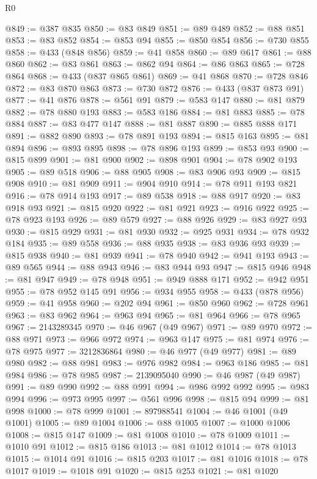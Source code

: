 \begin{lexlean}{R0}
\begin{coremodule}
@849 := @387 @835
@850 := @83 @849
@851 := @89 @489
@852 := @88 @851
@853 := @83 @852
@854 := @853 @94
@855 := @850 @854
@856 := @730 @855
@858 := @433 (@848 @856)
@859 := @41 @858
@860 := @89 @617
@861 := @88 @860
@862 := @83 @861
@863 := @862 @94
@864 := @86 @863
@865 := @728 @864
@868 := @433 (@837 @865 @861)
@869 := @41 @868
@870 := @728 @846
@872 := @83 @870 @863
@873 := @730 @872
@876 := @433 (@837 @873 @91)
@877 := @41 @876
@878 := @561 @91
@879 := @583 @147
@880 := @81 @879
@882 := @78 @880 @193
@883 := @583 @186
@884 := @81 @883
@885 := @78 @884
@887 := @83 @477 @147
@888 := @81 @887
@890 := @885 @888 @171
@891 := @882 @890
@893 := @78 @891 @193
@894 := @815 @163
@895 := @81 @894
@896 := @893 @895
@898 := @78 @896 @193
@899 := @853 @93
@900 := @815 @899
@901 := @81 @900
@902 := @898 @901
@904 := @78 @902 @193
@905 := @89 @518
@906 := @88 @905
@908 := @83 @906 @93
@909 := @815 @908
@910 := @81 @909
@911 := @904 @910
@914 := @78 @911 @193 @821
@916 := @78 @914 @193
@917 := @89 @538
@918 := @88 @917
@920 := @83 @918 @93
@921 := @815 @920
@922 := @81 @921
@923 := @916 @922
@925 := @78 @923 @193
@926 := @89 @579
@927 := @88 @926
@929 := @83 @927 @93
@930 := @815 @929
@931 := @81 @930
@932 := @925 @931
@934 := @78 @932 @184
@935 := @89 @558
@936 := @88 @935
@938 := @83 @936 @93
@939 := @815 @938
@940 := @81 @939
@941 := @78 @940
@942 := @941 @193
@943 := @89 @565
@944 := @88 @943
@946 := @83 @944 @93
@947 := @815 @946
@948 := @81 @947
@949 := @78 @948
@951 := @949 @888 @171
@952 := @942 @951
@955 := @78 @952 @145 @91
@956 := @934 @955
@958 := @433 (@878 @956)
@959 := @41 @958
@960 := @202 @94
@961 := @850 @960
@962 := @728 @961
@963 := @83 @962
@964 := @963 @94
@965 := @81 @964
@966 := @78 @965
@967 := 2143289345
@970 := @46 @967 (@49 @967)
@971 := @89 @970
@972 := @88 @971
@973 := @966 @972
@974 := @963 @147
@975 := @81 @974
@976 := @78 @975
@977 := 3212836864
@980 := @46 @977 (@49 @977)
@981 := @89 @980
@982 := @88 @981
@983 := @976 @982
@984 := @963 @186
@985 := @81 @984
@986 := @78 @985
@987 := 2139095040
@990 := @46 @987 (@49 @987)
@991 := @89 @990
@992 := @88 @991
@994 := @986 @992 @992
@995 := @983 @994
@996 := @973 @995
@997 := @561 @996
@998 := @815 @94
@999 := @81 @998
@1000 := @78 @999
@1001 := 897988541
@1004 := @46 @1001 (@49 @1001)
@1005 := @89 @1004
@1006 := @88 @1005
@1007 := @1000 @1006
@1008 := @815 @147
@1009 := @81 @1008
@1010 := @78 @1009
@1011 := @1010 @91
@1012 := @815 @186
@1013 := @81 @1012
@1014 := @78 @1013
@1015 := @1014 @91
@1016 := @815 @203
@1017 := @81 @1016
@1018 := @78 @1017
@1019 := @1018 @91
@1020 := @815 @253
@1021 := @81 @1020

\end{coremodule}
\end{lexlean}
